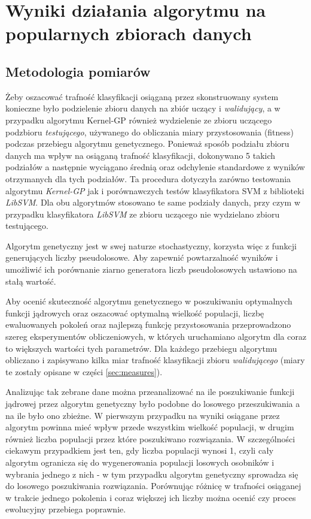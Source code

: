 
\chapter{Wyniki działania algorytmu na popularnych zbiorach danych}

\section{Metodologia pomiarów}
	Żeby oszacować trafność klasyfikacji osiąganą przez skonstruowany system konieczne było podzielenie zbioru danych na zbiór uczący i \emph{walidujący}, a w przypadku algorytmu Kernel-GP również wydzielenie ze zbioru uczącego podzbioru \emph{testującego}, używanego do obliczania miary przystosowania (fitness) podczas przebiegu algorytmu genetycznego. Ponieważ sposób podziału zbioru danych ma wpływ na osiąganą trafność klasyfikacji, dokonywano 5 takich podziałów a następnie wyciągano średnią oraz odchylenie standardowe z wyników otrzymanych dla tych podziałów. Ta procedura dotyczyła zarówno testowania algorytmu \emph{Kernel-GP} jak i porównawczych testów klasyfikatora SVM z biblioteki \emph{LibSVM}. Dla obu algorytmów stosowano te same podziały danych, przy czym w przypadku klasyfikatora \emph{LibSVM} ze zbioru uczącego nie wydzielano zbioru testującego.
	
	Algorytm genetyczny jest w swej naturze stochastyczny, korzysta więc z funkcji generujących liczby pseudolosowe. Aby zapewnić powtarzalność wyników i umożliwić ich porównanie ziarno generatora liczb pseudolosowych ustawiono na stałą wartość.

	Aby ocenić skuteczność algorytmu genetycznego w poszukiwaniu optymalnych funkcji jądrowych oraz oszacować optymalną wielkość populacji, liczbę ewaluowanych pokoleń oraz najlepszą funkcję przystosowania przeprowadzono szereg eksperymentów obliczeniowych, w których uruchamiano algorytm dla coraz to większych wartości tych parametrów. Dla każdego przebiegu algorytmu obliczano i zapisywano kilka miar trafność klasyfikacji zbioru \emph{walidującego} (miary te zostały opisane w części \ref{sec:measures}).

	Analizując tak zebrane dane można przeanalizować na ile poszukiwanie funkcji jądrowej przez algorytm genetyczny było podobne do losowego przeszukiwania a na ile było ono zbieżne. W pierwszym przypadku na wyniki osiągane przez algorytm powinna mieć wpływ przede wszystkim wielkość populacji, w drugim również liczba populacji przez które poszukiwano rozwiązania. W szczególności ciekawym przypadkiem jest ten, gdy liczba populacji wynosi 1, czyli cały algorytm ogranicza się do wygenerowania populacji losowych osobników i wybrania jednego z nich - w tym przypadku algorytm genetyczny sprowadza się do losowego poszukiwania rozwiązania. Porównując różnicę w trafności osiąganej w trakcie jednego pokolenia i coraz większej ich liczby można ocenić czy proces ewolucyjny przebiega poprawnie. 
	
